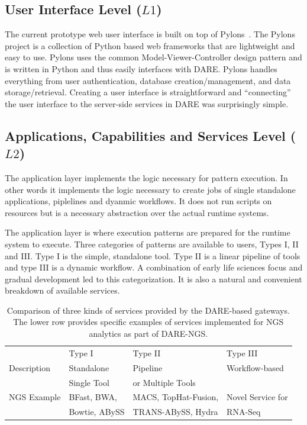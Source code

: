 \documentclass[]{svjour3}
\begin{document}
\subsection{User Interface Level ($L1$)}

The current prototype web user interface is built on top of
Pylons~\cite{pylons_website}. The Pylons project is a collection of
Python based web frameworks that are lightweight and easy to use. Pylons
uses the common Model-Viewer-Controller design pattern and is written
in Python and thus easily interfaces with DARE. Pylons handles everything
from user authentication, database creation/management,
and data storage/retrieval. Creating a user interface is straightforward
and ``connecting'' the user interface to the server-side services in DARE
was surprisingly simple.


\subsection{Applications, Capabilities and Services Level ($L2$)}

The application layer implements the logic necessary for pattern
execution. In other words it implements the logic necessary to
create jobs of single standalone applications, piplelines and
dyanmic workflows. It does not run scripts on resources but is
a necessary abstraction over the actual runtime systems. 

The application layer is where execution patterns are prepared for the
runtime system to execute. Three categories of patterns are available
to users, Types I, II and III. Type I is the simple, standalone tool. 
Type II is a linear pipeline of tools and type III is a dynamic workflow.
A combination of early life sciences focus and gradual development
led to this categorization. It is also a natural and convenient
breakdown of available services.


\begin{table}[!h]
\centering
\begin{tabular}{| l | l | l | l |} \hline \rowcolor[rgb]{0.8,0.8,0.8} &
Type I & Type II & Type III \\ Description & Standalone & Pipeline & Workflow-based \\ 
& Single Tool & or Multiple Tools & \\\hline 
NGS Example & BFast, BWA, & MACS, TopHat-Fusion, &  Novel Service for 
 \\
 & Bowtie, ABySS & TRANS-ABySS, Hydra & RNA-Seq \\
\hline
\end{tabular}
\caption{Comparison of three kinds of services provided by the
 DARE-based gateways. The lower row provides specific examples of
 services implemented for NGS analytics as part of DARE-NGS.}
\label{table:three-type-service}
\end{table}
\end{document}
